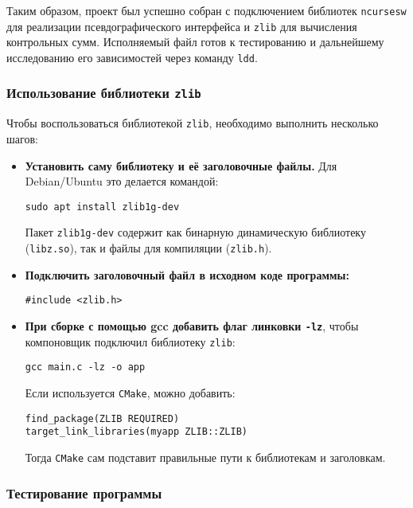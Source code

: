 
Таким образом, проект был успешно собран с подключением библиотек \texttt{ncursesw} для реализации псевдографического интерфейса и \texttt{zlib} для вычисления контрольных сумм. Исполняемый файл готов к тестированию и дальнейшему исследованию его зависимостей через команду \texttt{ldd}.

\subsubsection*{Использование библиотеки \texttt{zlib}}

Чтобы воспользоваться библиотекой \texttt{zlib}, необходимо выполнить несколько шагов:

\begin{itemize}
\item \textbf{Установить саму библиотеку и её заголовочные файлы.}
Для Debian/Ubuntu это делается командой:
\begin{verbatim}
sudo apt install zlib1g-dev
\end{verbatim}
Пакет \texttt{zlib1g-dev} содержит как бинарную динамическую библиотеку (\texttt{libz.so}), так и файлы для компиляции (\texttt{zlib.h}).

\item \textbf{Подключить заголовочный файл в исходном коде программы:}
\begin{verbatim}
#include <zlib.h>
\end{verbatim}

\item \textbf{При сборке с помощью gcc добавить флаг линковки \texttt{-lz}}, чтобы компоновщик подключил библиотеку \texttt{zlib}:
\begin{verbatim}
gcc main.c -lz -o app
\end{verbatim}

Если используется \texttt{CMake}, можно добавить:
\begin{verbatim}
find_package(ZLIB REQUIRED)
target_link_libraries(myapp ZLIB::ZLIB)
\end{verbatim}
Тогда \texttt{CMake} сам подставит правильные пути к библиотекам и заголовкам.

\end{itemize}

\subsubsection{Тестирование программы}

